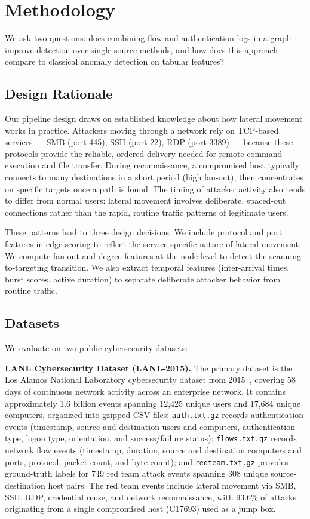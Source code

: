\section{Methodology}

We ask two questions: does combining flow and authentication logs in a graph improve detection over single-source methods, and how does this approach compare to classical anomaly detection on tabular features?

\subsection{Design Rationale}

Our pipeline design draws on established knowledge about how lateral movement works in practice. Attackers moving through a network rely on TCP-based services --- SMB (port 445), SSH (port 22), RDP (port 3389) --- because these protocols provide the reliable, ordered delivery needed for remote command execution and file transfer. During reconnaissance, a compromised host typically connects to many destinations in a short period (high fan-out), then concentrates on specific targets once a path is found. The timing of attacker activity also tends to differ from normal users: lateral movement involves deliberate, spaced-out connections rather than the rapid, routine traffic patterns of legitimate users.

These patterns lead to three design decisions. We include protocol and port features in edge scoring to reflect the service-specific nature of lateral movement. We compute fan-out and degree features at the node level to detect the scanning-to-targeting transition. We also extract temporal features (inter-arrival times, burst scores, active duration) to separate deliberate attacker behavior from routine traffic.

\subsection{Datasets}

We evaluate on two public cybersecurity datasets:

\textbf{LANL Cybersecurity Dataset (LANL-2015).}
The primary dataset is the Los Alamos National Laboratory cybersecurity dataset from 2015~\cite{lanl2015}, covering 58 days of continuous network activity across an enterprise network. It contains approximately 1.6 billion events spanning 12,425 unique users and 17,684 unique computers, organized into gzipped CSV files: \texttt{auth.txt.gz} records authentication events (timestamp, source and destination users and computers, authentication type, logon type, orientation, and success/failure status); \texttt{flows.txt.gz} records network flow events (timestamp, duration, source and destination computers and ports, protocol, packet count, and byte count); and \texttt{redteam.txt.gz} provides ground-truth labels for 749 red team attack events spanning 308 unique source-destination host pairs. The red team events include lateral movement via SMB, SSH, RDP, credential reuse, and network reconnaissance, with 93.6\% of attacks originating from a single compromised host (C17693) used as a jump box.

